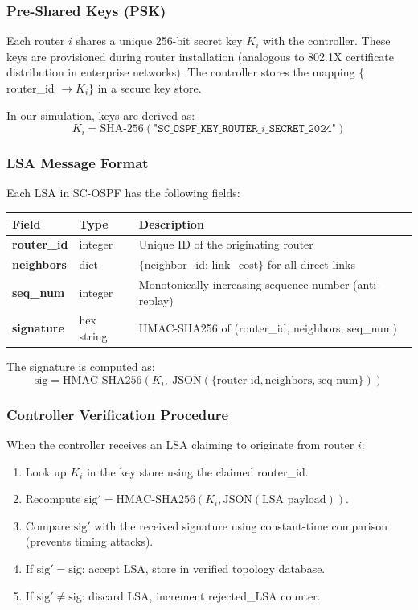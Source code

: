 \documentclass[12pt,a4paper]{article}
\begin{document}
\subsubsection{Pre-Shared Keys (PSK)}

Each router $i$ shares a unique 256-bit secret key $K_i$ with the controller.
These keys are provisioned during router installation (analogous to 802.1X
certificate distribution in enterprise networks). The controller stores the
mapping $\{$router\_id $\rightarrow K_i\}$ in a secure key store.

In our simulation, keys are derived as:
\[
K_i = \text{SHA-256}(\texttt{"SC\_OSPF\_KEY\_ROUTER\_}i\texttt{\_SECRET\_2024"})
\]

\subsubsection{LSA Message Format}

Each LSA in SC-OSPF has the following fields:

\begin{center}
\begin{tabular}{>{\bfseries}lll}
\toprule
Field & Type & Description \\
\midrule
router\_id & integer & Unique ID of the originating router \\
neighbors & dict & $\{$neighbor\_id: link\_cost$\}$ for all direct links \\
seq\_num & integer & Monotonically increasing sequence number (anti-replay) \\
signature & hex string & HMAC-SHA256 of (router\_id, neighbors, seq\_num) \\
\bottomrule
\end{tabular}
\end{center}

The signature is computed as:
\[
\text{sig} = \text{HMAC-SHA256}(K_i,\ \text{JSON}(\{\text{router\_id}, \text{neighbors}, \text{seq\_num}\}))
\]

\subsubsection{Controller Verification Procedure}

When the controller receives an LSA claiming to originate from router $i$:

\begin{enumerate}
  \item Look up $K_i$ in the key store using the claimed router\_id.
  \item Recompute $\text{sig}' = \text{HMAC-SHA256}(K_i, \text{JSON}(\text{LSA payload}))$.
  \item Compare $\text{sig}'$ with the received signature using constant-time comparison (prevents timing attacks).
  \item If $\text{sig}' = \text{sig}$: accept LSA, store in verified topology database.
  \item If $\text{sig}' \neq \text{sig}$: discard LSA, increment rejected\_LSA counter.
\end{enumerate}
\end{document}
